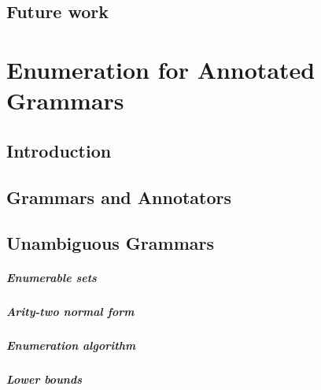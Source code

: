 \documentclass[pdftex]{pucthesis}	%
\begin{document}
\section{Future work}\label{nested:sec:conclusions}




\chapter[ENUMERATION FOR ANNOTATED GRAMMARS]{Enumeration for Annotated Grammars} \label{ch2}

\section{Introduction}



\section{Grammars and Annotators}\label{gram:sec:models}



\section{Unambiguous Grammars} \label{gram:sec:cubic}



\paragraph{Enumerable sets}


\paragraph{Arity-two normal form}


\paragraph{Enumeration algorithm}


\paragraph{Lower bounds}

\end{document}
